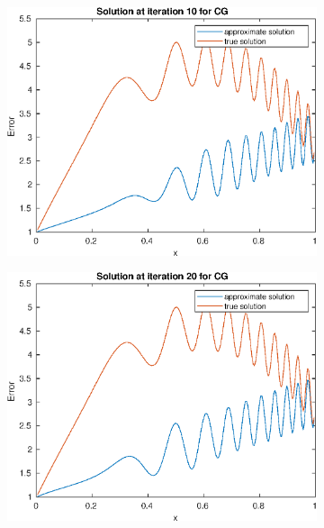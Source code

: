 \documentclass{article}
\begin{document}
\begin{figure}[H]
\begin{subfigure}{0.495\linewidth}
        \includegraphics[width=\linewidth]{CG_i=10.eps}
    \end{subfigure}
    \begin{subfigure}{0.495\linewidth}
        \centering
        \includegraphics[width=\linewidth]{CG_i=20.eps}
    \end{subfigure}
    \begin{subfigure}{0.495\linewidth}
        \centering

\end{subfigure}
\end{figure}
\end{document}
